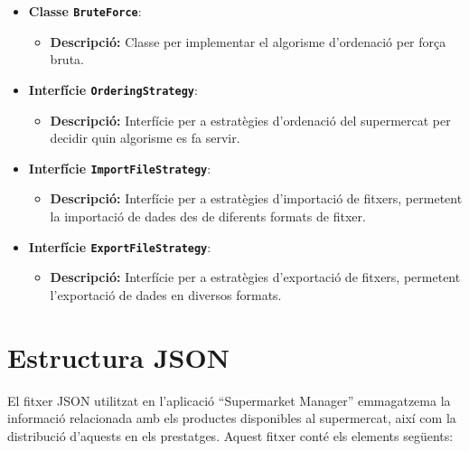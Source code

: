 \documentclass[a4paper,12pt]{report}
\begin{document}
\begin{itemize}
		\item \textbf{Classe \texttt{BruteForce}}:
		\begin{itemize}
			\item \textbf{Descripció:} Classe per implementar el algorisme d'ordenació per força bruta.
		\end{itemize}
		\item \textbf{Interfície \texttt{OrderingStrategy}}:
		\begin{itemize}
			\item \textbf{Descripció:} Interfície per a estratègies d'ordenació del supermercat per decidir quin algorisme es fa servir.
		\end{itemize}
		\item \textbf{Interfície \texttt{ImportFileStrategy}}:
		\begin{itemize}
			\item \textbf{Descripció:} Interfície per a estratègies d'importació de fitxers, permetent la importació de dades des de diferents formats de fitxer.
		\end{itemize}
		\item \textbf{Interfície \texttt{ExportFileStrategy}}:
		\begin{itemize}
			\item \textbf{Descripció:} Interfície per a estratègies d'exportació de fitxers, permetent l'exportació de dades en diversos formats.
		\end{itemize}
	\end{itemize}
	
	\section{Estructura JSON}
	
	El fitxer JSON utilitzat en l'aplicació ``Supermarket Manager'' emmagatzema la informació relacionada amb els productes disponibles al supermercat, així com la distribució d'aquests en els prestatges. Aquest fitxer conté els elements següents:
	
\end{document}
